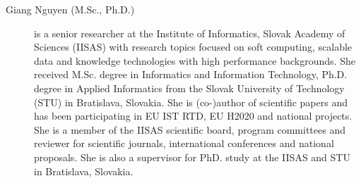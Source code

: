 \documentclass[smallextended,natbib]{svjour3}       %
\begin{document}
\begin{description}
\item[Giang Nguyen (M.Sc., Ph.D.)]			%
is a senior researcher at the Institute of Informatics, Slovak Academy of Sciences (IISAS) with research topics focused on soft computing, scalable data and knowledge technologies with high performance backgrounds. She received M.Sc. degree in Informatics and Information Technology, Ph.D. degree in Applied Informatics from the Slovak University of Technology (STU) in Bratislava, Slovakia. She is (co-)author of scientific papers and has been participating in EU IST RTD, EU H2020 and national projects. She is a member of the IISAS scientific board, program committees and reviewer for scientific journals, international conferences and national proposals. She is also a supervisor for PhD. study at the IISAS and STU in Bratislava, Slovakia.


 
\end{description}
\end{document}
